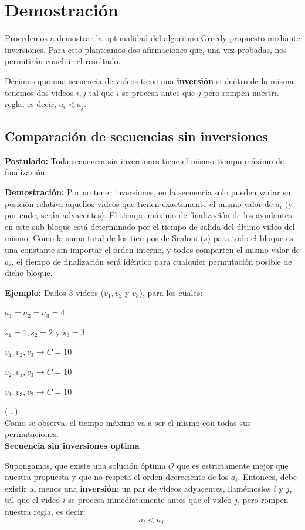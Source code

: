 \section{Demostración}

Procedemos a demostrar la optimalidad del algoritmo Greedy propuesto mediante inversiones. Para esto planteamos dos afirmaciones que, una vez probadas, nos permitirán concluir el resultado.

Decimos que una secuencia de videos tiene una \textbf{inversión} si dentro de la misma tenemos dos videos $i, j$ tal que $i$ se procesa antes que $j$ pero rompen nuestra regla, es decir, $a_i < a_j$.

\subsection{Comparación de secuencias sin inversiones}

\textbf{Postulado:} Toda secuencia sin inversiones tiene el mismo tiempo máximo de finalización.

\textbf{Demostración:} Por no tener inversiones, en la secuencia solo pueden variar su posición relativa aquellos videos que tienen exactamente el mismo valor de $a_i$ (y por ende, serán adyacentes). El tiempo máximo de finalización de los ayudantes en este sub-bloque está determinado por el tiempo de salida del último video del mismo. Como la suma total de los tiempos de Scaloni ($s$) para todo el bloque es una constante sin importar el orden interno, y todos comparten el mismo valor de $a_i$, el tiempo de finalización será idéntico para cualquier permutación posible de dicho bloque.

\textbf{Ejemplo:}
Dados 3 videos ($v_1, v_2$ y $v_3$), para los cuales:

$a_1 = a_2 = a_3 = 4$

$s_1 = 1, s_2 = 2$ y $s_3 = 3$

$v_1, v_2, v_3 \rightarrow C = 10$

$v_2, v_1, v_3 \rightarrow C = 10$

$v_1, v_3, v_2 \rightarrow C = 10$

(...) \\
Como se observa, el tiempo máximo va a ser el mismo con todas sus permutaciones.
\\

\textbf{Secuencia sin inversiones optima}

Supongamos, que existe una solución óptima $\mathcal{O}$ que es estrictamente mejor que nuestra propuesta y que no respeta el orden decreciente de los $a_i$. Entonces, debe existir al menos una \textbf{inversión}: un par de videos adyacentes, llamémoslos $i$ y $j$, tal que el video $i$ se procesa inmediatamente antes que el video $j$, pero rompen nuestra regla, es decir:
\[
a_i < a_j.
\]

